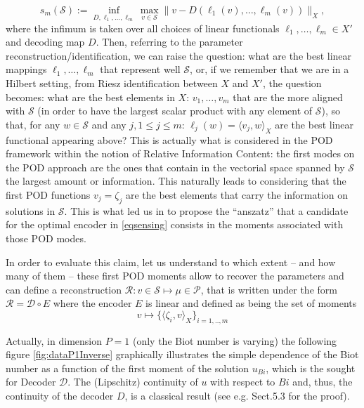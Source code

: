 \documentclass[graybox]{svmult}
\begin{document}
\begin{equation}
    \label{eqsensing}
    s_m({\mathcal S}):=
\inf_{D,\ell_1,\dots,\ell_m}
\max_{v\in{\mathcal S}} \|v-D(\ell_1(v),\dots,\ell_m(v))\|_X,
\end{equation}
where the infimum is taken over all choices of linear functionals $\ell_1,\dots,\ell_m\in X'$
and decoding map $D$. Then, referring to the parameter reconstruction/identification, we can raise the question: what are the best linear mappings $\ell_1,\dots,\ell_m$ that represent well ${\mathcal S}$, or, if we remember that we are in a Hilbert setting, from Riesz identification between $X$ and $X'$, the question becomes: what are the best elements in $X$: $v_1,\dots,v_m$ that 
are the more aligned with ${\mathcal S}$ (in order to have the largest scalar product with any element of ${\mathcal S}$), so that, for any $w\in {\mathcal S}$ and any $j, 1\le j\le m$: $\ell_j(w)= \langle v_j,w\rangle_{X}$ are the best linear functional appearing above? This is actually what is considered in the POD framework within the notion of Relative Information Content: the first modes on the POD approach are the ones that contain in the vectorial space spanned by ${\mathcal S}$ the largest amount or information. This naturally leads to considering that the first POD functions $v_j=\zeta_j$ are the best elements that carry the information on solutions in $ {\mathcal S}$. This is what led us in \cite {barnett2022quadratic, barnett2023, cohen2023nonlinear} to propose the ``anszatz'' that a candidate for the optimal encoder in \eqref{eqsensing} consists in the moments associated with those POD modes.

In order to evaluate this claim, let us understand to which extent -- and how many of them -- these first POD moments allow to recover the parameters and can define a reconstruction ${\mathcal R} : v\in {\mathcal S}\mapsto \mu\in {\mathcal P}$, that is written under the form ${\mathcal R} = {\mathcal D}\circ E$
where the encoder $E$ is linear and defined as being the set of moments
\begin{equation}
    v\mapsto \{ \langle \zeta_i,v\rangle_{X}\}_{i=1,..,m}
\end{equation}

Actually, in dimension $P=1$ (only the Biot number is varying) the following figure \ref{fig:dataP1Inverse}
graphically illustrates the simple dependence of the Biot number as a function of the first moment of the solution $u_{Bi}$, which is the sought for Decoder ${\mathcal D}$. The (Lipschitz) continuity of $u$ with respect to $Bi$ and, thus, the continuity of the decoder $D$, is a classical result (see e.g. \cite{bookRb} Sect.5.3 for the proof).
\end{document}
